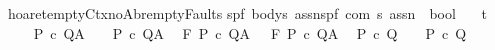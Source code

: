 \begin{isabellebody}
\isanewline
{\isachardoublequoteopen}{\isacharunderscore}hoaret{\isacharunderscore}emptyCtx{\isacharunderscore}noAbr{\isacharunderscore}emptyFaults{\isachardoublequoteclose}{\isacharcolon}{\isacharcolon}\isanewline
{\isachardoublequoteopen}{\isacharbrackleft}{\isacharparenleft}{\isacharprime}s{\isacharcomma}{\isacharprime}p{\isacharcomma}{\isacharprime}f{\isacharparenright}\ body{\isacharcomma}{\isacharprime}s\ assn{\isacharcomma}{\isacharparenleft}{\isacharprime}s{\isacharcomma}{\isacharprime}p{\isacharcomma}{\isacharprime}f{\isacharparenright}\ com{\isacharcomma}\ {\isacharprime}s\ assn{\isacharbrackright}\ {\isacharequal}{\isachargreater}\ bool{\isachardoublequoteclose}\isanewline
\ \ \ {\isacharparenleft}{\isachardoublequoteopen}{\isacharparenleft}{}{\isacharunderscore}{\isacharslash}{\isacharbar}{\isacharminus}t{\isacharparenleft}{\isacharunderscore}{\isacharslash}\ {\isacharparenleft}{\isacharunderscore}{\isacharparenright}{\isacharslash}\ {\isacharunderscore}{\isacharparenright}{\isacharparenright}{\isachardoublequoteclose}\ {\isacharbrackleft}{}{}{\isacharcomma}{}{}{}{}{\isacharcomma}{}{}{\isacharcomma}{}{}{}{}{\isacharbrackright}{}{}{\isacharparenright}\isanewline
\isanewline
{}\isamarkupfalse%
\isanewline
\ \isanewline
\isanewline
\ {\isachardoublequoteopen}{\isasymGamma}{\isasymturnstile}\ P\ c\ Q{\isacharcomma}A{\isachardoublequoteclose}\ \ {\isacharequal}{\isacharequal}\ {\isachardoublequoteopen}{\isasymGamma}{\isasymturnstile}\isactrlbsub {\isacharslash}{\isacharbraceleft}{\isacharbraceright}\isactrlesub \ P\ c\ Q{\isacharcomma}A{\isachardoublequoteclose}\ \isanewline
\ {\isachardoublequoteopen}{\isasymGamma}{\isasymturnstile}\isactrlbsub {\isacharslash}F\isactrlesub \ P\ c\ Q{\isacharcomma}A{\isachardoublequoteclose}\ \ {\isacharequal}{\isacharequal}\ {\isachardoublequoteopen}{\isasymGamma}{\isacharcomma}{\isacharbraceleft}{\isacharbraceright}{\isasymturnstile}\isactrlbsub {\isacharslash}F\isactrlesub \ P\ c\ Q{\isacharcomma}A{\isachardoublequoteclose}\isanewline
\isanewline
\ {\isachardoublequoteopen}{\isasymGamma}{\isacharcomma}{\isasymTheta}{\isasymturnstile}\ P\ c\ Q{\isachardoublequoteclose}\ \ {\isacharequal}{\isacharequal}\ {\isachardoublequoteopen}{\isasymGamma}{\isacharcomma}{\isasymTheta}{\isasymturnstile}\isactrlbsub {\isacharslash}{\isacharbraceleft}{\isacharbraceright}\isactrlesub \ P\ c\ Q{\isachardoublequoteclose}\isanewline

\end{isabellebody}
